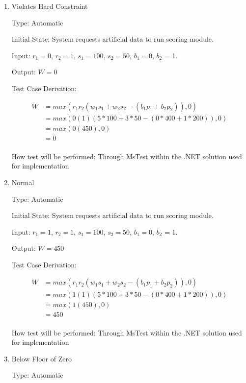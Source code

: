 \documentclass[12pt, titlepage]{article}
\begin{document}
\begin{enumerate}

\item{Violates Hard Constraint\\}

Type: Automatic
					
Initial State: System requests artificial data to run scoring module.
					
Input: $r_1 = 0$, $r_2 = 1$, $s_1 = 100$, $s_2 = 50$, $b_1 = 0$, $b_2$ = 1.
					
Output: $W = 0$

Test Case Derivation: 

\begin{align*}
W &= max(r_1r_2(w_1s_1 + w_2s_2 - (b_1p_1 + b_2p_2)), 0) \\
  &= max(0(1)(5*100 + 3*50 - (0*400 + 1*200)), 0) \\
  &= max(0(450), 0) \\
  &= 0 \\
\end{align*}

How test will be performed: Through MsTest within the .NET solution used for implementation

\item{Normal \\}

Type: Automatic
					
Initial State: System requests artificial data to run scoring module.
					
Input: $r_1 = 1$, $r_2 = 1$, $s_1 = 100$, $s_2 = 50$, $b_1 = 0$, $b_2$ = 1.
					
Output: $W = 450$

Test Case Derivation: 

\begin{align*}
W &= max(r_1r_2(w_1s_1 + w_2s_2 - (b_1p_1 + b_2p_2)), 0) \\
  &= max(1(1)(5*100 + 3*50 - (0*400 + 1*200)), 0) \\
  &= max(1(450), 0) \\
  &= 450 \\
\end{align*}

How test will be performed: Through MsTest within the .NET solution used for implementation

\item{Below Floor of Zero\\}

Type: Automatic
					

\end{enumerate}
\end{document}
